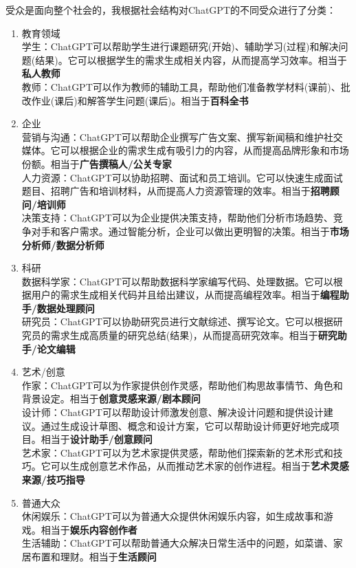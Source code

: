 \documentclass[a4paper]{article}
\begin{document}
受众是面向整个社会的，我根据社会结构对ChatGPT的不同受众进行了分类：
\begin{enumerate}
    \item 教育领域\\
        学生：ChatGPT可以帮助学生进行课题研究(开始)、辅助学习(过程)和解决问题(结果)。它可以根据学生的需求生成相关内容，从而提高学习效率。相当于\textbf{私人教师}\\
        教师：ChatGPT可以作为教师的辅助工具，帮助他们准备教学材料(课前)、批改作业(课后)和解答学生问题(课后)。相当于\textbf{百科全书}
    \item 企业\\
        营销与沟通：ChatGPT可以帮助企业撰写广告文案、撰写新闻稿和维护社交媒体。它可以根据企业的需求生成有吸引力的内容，从而提高品牌形象和市场份额。相当于\textbf{广告撰稿人/公关专家}\\
        人力资源：ChatGPT可以协助招聘、面试和员工培训。它可以快速生成面试题目、招聘广告和培训材料，从而提高人力资源管理的效率。相当于\textbf{招聘顾问/培训师}\\
        决策支持：ChatGPT可以为企业提供决策支持，帮助他们分析市场趋势、竞争对手和客户需求。通过智能分析，企业可以做出更明智的决策。相当于\textbf{市场分析师/数据分析师}\\
    \item 科研\\
        数据科学家：ChatGPT可以帮助数据科学家编写代码、处理数据。它可以根据用户的需求生成相关代码并且给出建议，从而提高编程效率。相当于\textbf{编程助手/数据处理顾问}\\
        研究员：ChatGPT可以协助研究员进行文献综述、撰写论文。它可以根据研究员的需求生成高质量的研究总结(结果)，从而提高研究效率。相当于\textbf{研究助手/论文编辑}
    \item 艺术/创意\\
        作家：ChatGPT可以为作家提供创作灵感，帮助他们构思故事情节、角色和背景设定。相当于\textbf{创意灵感来源/剧本顾问}\\
        设计师：ChatGPT可以帮助设计师激发创意、解决设计问题和提供设计建议。通过生成设计草图、概念和设计方案，它可以帮助设计师更好地完成项目。相当于\textbf{设计助手/创意顾问}\\
        艺术家：ChatGPT可以为艺术家提供灵感，帮助他们探索新的艺术形式和技巧。它可以生成创意艺术作品，从而推动艺术家的创作进程。相当于\textbf{艺术灵感来源/技巧指导}
    \item 普通大众\\
        休闲娱乐：ChatGPT可以为普通大众提供休闲娱乐内容，如生成故事和游戏。相当于\textbf{娱乐内容创作者}\\
        生活辅助：ChatGPT可以帮助普通大众解决日常生活中的问题，如菜谱、家居布置和理财。相当于\textbf{生活顾问}
\end{enumerate}
\end{document}
